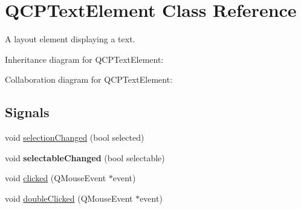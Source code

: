 \hypertarget{classQCPTextElement}{}\section{Q\+C\+P\+Text\+Element Class Reference}
\label{classQCPTextElement}


A layout element displaying a text.  




Inheritance diagram for Q\+C\+P\+Text\+Element\+:


Collaboration diagram for Q\+C\+P\+Text\+Element\+:
\subsection*{Signals}
\begin{DoxyCompactItemize}
\item 
void \hyperlink{classQCPTextElement_a49f45b87ee9c1fe866c2cdd12af17a9a}{selection\+Changed} (bool selected)
\item 
void {\bfseries selectable\+Changed} (bool selectable)\hypertarget{classQCPTextElement_ac4567260b52d02bfbad63357d13986c5}{}\label{classQCPTextElement_ac4567260b52d02bfbad63357d13986c5}

\item 
void \hyperlink{classQCPTextElement_ad2246a0e701c0655623f048737298334}{clicked} (Q\+Mouse\+Event $\ast$event)
\item 
void \hyperlink{classQCPTextElement_a9c6fd27ae8a7c3a02df7a6bbd3509e40}{double\+Clicked} (Q\+Mouse\+Event $\ast$event)
\end{DoxyCompactItemize}
